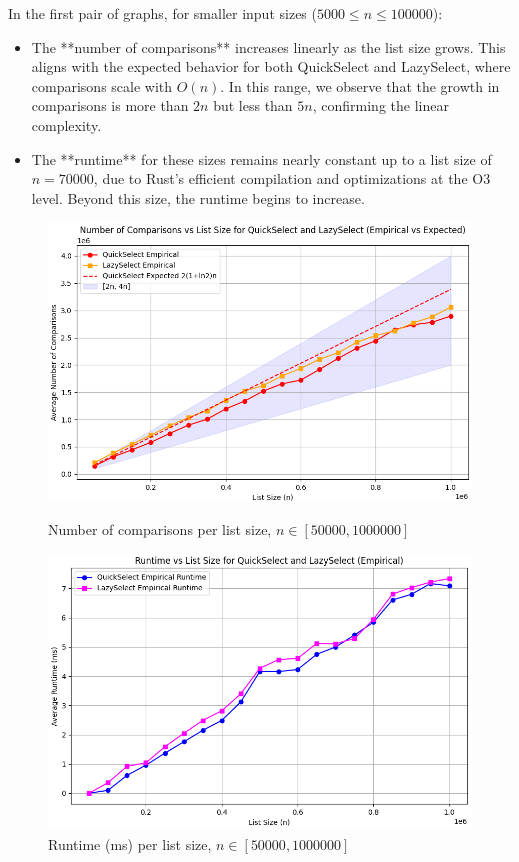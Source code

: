 \documentclass{article}
\begin{document}
\noindent In the first pair of graphs, for smaller input sizes (\(5000 \leq n \leq 100000\)):
\begin{itemize}
    \item The **number of comparisons** increases linearly as the list size grows. This aligns with the expected behavior for both QuickSelect and LazySelect, where comparisons scale with \(O(n)\). In this range, we observe that the growth in comparisons is more than \(2n\) but less than \(5n\), confirming the linear complexity.
    \item The **runtime** for these sizes remains nearly constant up to a list size of \(n = 70000\), due to Rust’s efficient compilation and optimizations at the O3 level. Beyond this size, the runtime begins to increase.
\end{itemize}

\begin{figure}[H]
    \centering
    \begin{minipage}{0.45\textwidth}
        \centering
        \includegraphics[width=\textwidth]{assets1/graphics/comparisons_results_50000_1000000_50000_100.png}
        \caption{Number of comparisons per list size, $n \in [50000, 1000000]$}
    \end{minipage}
    \hfill
    \begin{minipage}{0.45\textwidth}
        \centering
        \includegraphics[width=\textwidth]{assets1/graphics/runtime_results_50000_1000000_50000_100.png}
        \caption{Runtime (ms) per list size, $n \in [50000, 1000000]$}
    \end{minipage}
\end{figure}
\end{document}
